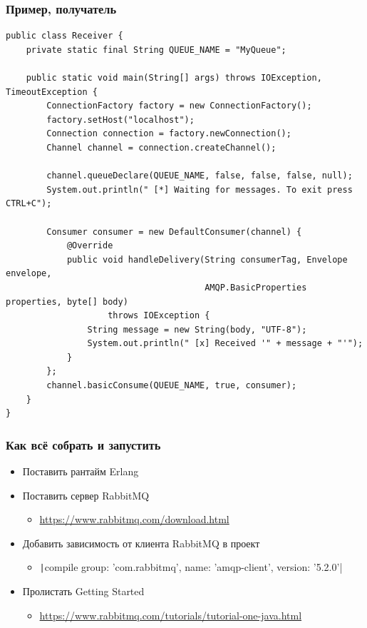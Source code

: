 \documentclass[xetex,mathserif,serif]{beamer}
\begin{document}
	\begin{frame}[fragile]
		\frametitle{Пример, получатель}
		\begin{ssmall}
			\begin{verbatim}
public class Receiver {
    private static final String QUEUE_NAME = "MyQueue";

    public static void main(String[] args) throws IOException, TimeoutException {
        ConnectionFactory factory = new ConnectionFactory();
        factory.setHost("localhost");
        Connection connection = factory.newConnection();
        Channel channel = connection.createChannel();

        channel.queueDeclare(QUEUE_NAME, false, false, false, null);
        System.out.println(" [*] Waiting for messages. To exit press CTRL+C");

        Consumer consumer = new DefaultConsumer(channel) {
            @Override
            public void handleDelivery(String consumerTag, Envelope envelope,
                                       AMQP.BasicProperties properties, byte[] body)
                    throws IOException {
                String message = new String(body, "UTF-8");
                System.out.println(" [x] Received '" + message + "'");
            }
        };
        channel.basicConsume(QUEUE_NAME, true, consumer);
    }
}
			\end{verbatim}
		\end{ssmall}
	\end{frame}

	\begin{frame}
		\frametitle{Как всё собрать и запустить}
		\begin{itemize}
			\item Поставить рантайм Erlang
			\item Поставить сервер RabbitMQ
			\begin{itemize}
				\item \url{https://www.rabbitmq.com/download.html}
			\end{itemize}
			\item Добавить зависимость от клиента RabbitMQ в проект
			\begin{itemize}
				\item \texttt|compile group: 'com.rabbitmq', name: 'amqp-client', version: '5.2.0'|
			\end{itemize}
			\item Пролистать Getting Started 
			\begin{itemize}
				\item \url{https://www.rabbitmq.com/tutorials/tutorial-one-java.html}
			\end{itemize}
		\end{itemize}
	\end{frame}
\end{document}
